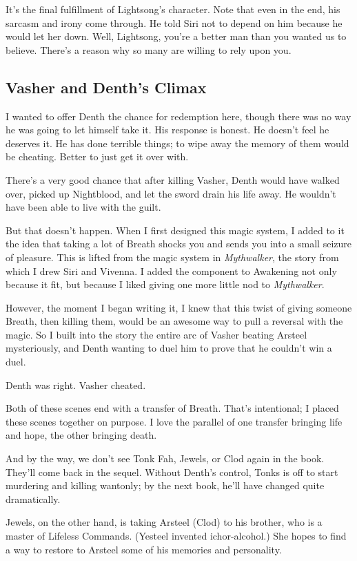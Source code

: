 It’s the final fulfillment of Lightsong’s character. Note that even in the end, his sarcasm and irony come through. He told Siri not to depend on him because he would let her down. Well, Lightsong, you’re a better man than you wanted us to believe. There’s a reason why so many are willing to rely upon you.

\subsection*{Vasher and Denth’s Climax}

I wanted to offer Denth the chance for redemption here, though there was no way he was going to let himself take it. His response is honest. He doesn’t feel he deserves it. He has done terrible things; to wipe away the memory of them would be cheating. Better to just get it over with.

There’s a very good chance that after killing Vasher, Denth would have walked over, picked up Nightblood, and let the sword drain his life away. He wouldn’t have been able to live with the guilt.

But that doesn’t happen. When I first designed this magic system, I added to it the idea that taking a lot of Breath shocks you and sends you into a small seizure of pleasure. This is lifted from the magic system in \textit{Mythwalker}, the story from which I drew Siri and Vivenna. I added the component to Awakening not only because it fit, but because I liked giving one more little nod to \textit{Mythwalker}.

However, the moment I began writing it, I knew that this twist of giving someone Breath, then killing them, would be an awesome way to pull a reversal with the magic. So I built into the story the entire arc of Vasher beating Arsteel mysteriously, and Denth wanting to duel him to prove that he couldn’t win a duel.

Denth was right. Vasher cheated.

Both of these scenes end with a transfer of Breath. That’s intentional; I placed these scenes together on purpose. I love the parallel of one transfer bringing life and hope, the other bringing death.

And by the way, we don’t see Tonk Fah, Jewels, or Clod again in the book. They’ll come back in the sequel. Without Denth’s control, Tonks is off to start murdering and killing wantonly; by the next book, he’ll have changed quite dramatically.

Jewels, on the other hand, is taking Arsteel (Clod) to his brother, who is a master of Lifeless Commands. (Yesteel invented ichor-alcohol.) She hopes to find a way to restore to Arsteel some of his memories and personality.

